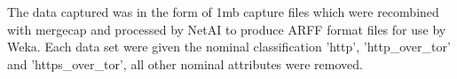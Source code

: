 The data captured was in the form of 1mb capture files which were recombined
with mergecap and processed by NetAI to produce ARFF format files for use by
Weka. Each data set were given the nominal classification 'http',
'http\_over\_tor' and 'https\_over\_tor', all other nominal attributes were
removed.

